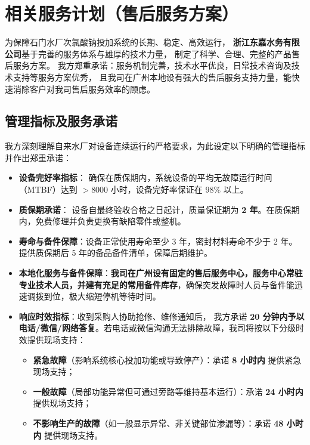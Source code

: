 \documentclass[UTF8,a4paper,12pt,titlepage]{ctexart}
\begin{document}


\tableofcontents %

\newpage %

\section{相关服务计划（售后服务方案）}

为保障石门水厂次氯酸钠投加系统的长期、稳定、高效运行，
\textbf{浙江东嘉水务有限公司}基于完善的服务体系与雄厚的技术力量，
制定了科学、合理、完整的产品售后服务方案。
我方郑重承诺：服务机制完善，技术水平优良，日常技术咨询及技术支持等服务方案优秀，
且我司在广州本地设有强大的售后服务支持力量，能快速消除客户对我司售后服务效率的顾虑。

\subsection{管理指标及服务承诺}
我方深刻理解自来水厂对设备连续运行的严格要求，为此设定以下明确的管理指标并作出郑重承诺：
\begin{itemize}
    \item \textbf{设备完好率指标}：
        确保在质保期内，系统设备的平均无故障运行时间（MTBF）达到 \(> 8000\) 小时，设备完好率保证在 \(98\%\) 以上。
    \item \textbf{质保期承诺}：
        设备自最终验收合格之日起计，质量保证期为 \textbf{2 年}。在质保期内，免费修理并负责更换有缺陷零件或整机。
    \item \textbf{寿命与备件保障}：设备正常使用寿命至少 3 年，密封材料寿命不少于 2 年。
        提供质保期后 5 年的备品备件清单，保障后期维护。
    \item \textbf{本地化服务与备件保障}：\textbf{我司在广州设有固定的售后服务中心，服务中心常驻专业技术人员，并建有充足的常用备件库存}，确保突发故障时人员与备件能迅速调拨到位，极大缩短停机等待时间。
    \item \textbf{响应时效指标}：收到采购人协助抢修、维修通知后，
        我方承诺 \textbf{20 分钟内予以电话/微信/网络答复}。若电话或微信沟通无法排除故障，我司将按以下分级时效提供现场支持：
        \begin{itemize}
            \item \textbf{紧急故障}（影响系统核心投加功能或导致停产）：承诺 \textbf{8 小时内} 提供紧急现场支持；
            \item \textbf{一般故障}（局部功能异常但可通过旁路等维持基本运行）：承诺 \textbf{24 小时内} 提供现场支持；
            \item \textbf{不影响生产的故障}（如一般显示异常、非关键部位渗漏等）：承诺 \textbf{48 小时内} 提供现场支持。
        \end{itemize}
\end{itemize}
\end{document}
